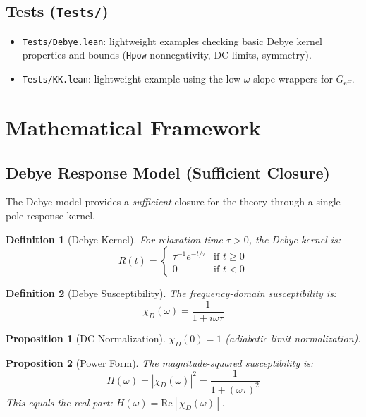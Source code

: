 \documentclass[11pt]{article}
\newtheorem{definition}{Definition}
\newtheorem{proposition}{Proposition}
\begin{document}
\subsection{Tests (\texttt{Tests/})}
\begin{itemize}
\item \texttt{Tests/Debye.lean}: lightweight examples checking basic Debye kernel properties and bounds (\texttt{Hpow} nonnegativity, DC limits, symmetry).

\item \texttt{Tests/KK.lean}: lightweight example using the low-$\omega$ slope wrappers for $G_{\mathrm{eff}}$.
\end{itemize}

\section{Mathematical Framework}

\subsection{Debye Response Model (Sufficient Closure)}

The Debye model provides a \emph{sufficient} closure for the theory through a single-pole response kernel.

\begin{definition}[Debye Kernel]
For relaxation time $\tau > 0$, the Debye kernel is:
\[
R(t) = \begin{cases}
\tau^{-1} e^{-t/\tau} & \text{if } t \geq 0 \\
0 & \text{if } t < 0
\end{cases}
\]
\end{definition}

\begin{definition}[Debye Susceptibility]
The frequency-domain susceptibility is:
\[
\chi_D(\omega) = \frac{1}{1 + i\omega\tau}
\]
\end{definition}

\begin{proposition}[DC Normalization]
$\chi_D(0) = 1$ (adiabatic limit normalization).
\end{proposition}

\begin{proposition}[Power Form]
The magnitude-squared susceptibility is:
\[
H(\omega) = |\chi_D(\omega)|^2 = \frac{1}{1 + (\omega\tau)^2}
\]
This equals the real part: $H(\omega) = \text{Re}[\chi_D(\omega)]$.
\end{proposition}
\end{document}
